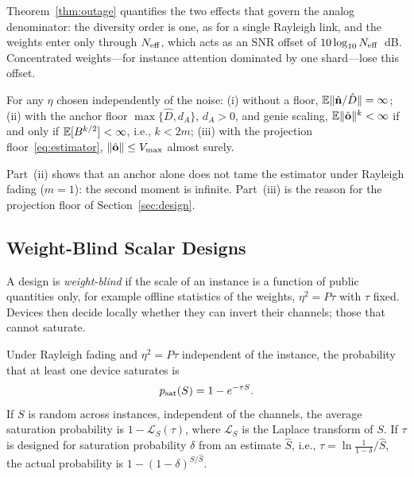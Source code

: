 Theorem~\ref{thm:outage} quantifies the two effects that govern the analog denominator: the diversity order is one, as for a single Rayleigh link, and the weights enter only through $N_{\mathrm{eff}}$, which acts as an SNR offset of $10\log_{10}N_{\mathrm{eff}}$~dB. Concentrated weights---for instance attention dominated by one shard---lose this offset.

\begin{proposition}\label{prop:moments}
For any $\eta$ chosen independently of the noise: (i) without a floor, $\mathbb{E}\|\hat{\mathbf{n}}/\hat D\|=\infty$; (ii) with the anchor floor $\max\{\hat D,d_A\}$, $d_A>0$, and genie scaling, $\mathbb{E}\|\hat{\mathbf{o}}\|^k<\infty$ if and only if $\mathbb{E}[B^{k/2}]<\infty$, i.e., $k<2m$; (iii) with the projection floor~\eqref{eq:estimator}, $\|\hat{\mathbf{o}}\|\le V_{\max}$ almost surely.
\end{proposition}

Part~(ii) shows that an anchor alone does not tame the estimator under Rayleigh fading ($m=1$): the second moment is infinite. Part~(iii) is the reason for the projection floor of Section~\ref{sec:design}.

\subsection{Weight-Blind Scalar Designs}

A design is \emph{weight-blind} if the scale of an instance is a function of public quantities only, for example offline statistics of the weights, $\eta^2=P\tau$ with $\tau$ fixed. Devices then decide locally whether they can invert their channels; those that cannot saturate.

\begin{theorem}\label{thm:saturation}
Under Rayleigh fading and $\eta^2=P\tau$ independent of the instance, the probability that at least one device saturates is
\begin{equation}
p_{\rm sat}(S)=1-e^{-\tau S}.
\label{eq:psat}
\end{equation}
If $S$ is random across instances, independent of the channels, the average saturation probability is $1-\mathcal{L}_S(\tau)$, where $\mathcal{L}_S$ is the Laplace transform of $S$. If $\tau$ is designed for saturation probability $\delta$ from an estimate $\hat S$, i.e., $\tau=\ln\frac{1}{1-\delta}/\hat S$, the actual probability is $1-(1-\delta)^{S/\hat S}$.
\end{theorem}

